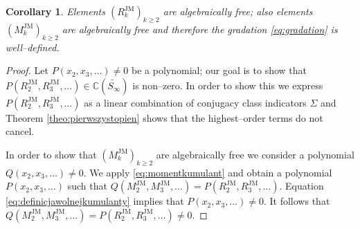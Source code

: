 \documentclass[12pt,dvips]{amsart}
\numberwithin{equation}{section} \numberwithin{figure}{section}
\theoremstyle{plain}
\newtheorem{corollary}[lemma]{Corollary}
\theoremstyle{definition}
\theoremstyle{remark}
\newcommand{\C}{{\mathbb{C}}}
\newcommand{\Sn}[1]{{{S}}_{#1}}
\newcommand{\MJM}{M^{\JM}}
\newcommand{\RJM}{R^{\JM}}
\newcommand{\PartPerm}[1]{\widetilde{\Sn{#1}}}
\DeclareMathOperator{\JM}{JM}
\begin{document}
\begin{corollary}
\label{cor:algebraicallyfree} Elements $(\RJM_k)_{k\geq 2}$ are
algebraically free; also elements $(\MJM_k)_{k\geq 2}$ are
algebraically free and therefore the gradation \eqref{eq:gradation}
is well--defined.
\end{corollary}
\begin{proof}
Let $P(x_2,x_3,\dots)\neq 0$ be a polynomial; our goal is to show
that $P(\RJM_2,\RJM_3,\dots)\in\C(\PartPerm{\infty})$ is non--zero.
In order to show this we express $P(\RJM_2,\RJM_3,\dots)$ as a
linear combination of conjugacy class indicators $\Sigma$ and
Theorem \ref{theo:pierwszystopien} shows that the highest--order
terms do not cancel.

In order to show that $(\MJM_k)_{k\geq 2}$ are algebraically free we
consider a polynomial $Q(x_2,x_3,\dots)\neq 0$. We apply
\eqref{eq:momentkumulant} and obtain a polynomial $P(x_2,x_3,\dots)$
such that $Q(\MJM_2,\MJM_3,\dots)=P(\RJM_2,\RJM_3,\dots)$. Equation
\eqref{eq:definicjawolnejkumulanty} implies that
$P(x_2,x_3,\dots)\neq 0$. It follows that
$Q(\MJM_2,\MJM_3,\dots)=P(\RJM_2,\RJM_3,\dots)\neq 0$.
\end{proof}
\end{document}
